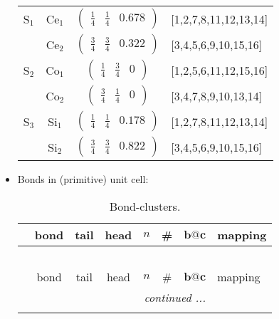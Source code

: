 \documentclass[fleqn,10pt,landscape]{article}
\begin{document}
\begin{itemize}
\begin{center}
\begin{longtable}{cc|c|l}
S$_{1}$ & Ce$_1$ & $\begin{pmatrix} \frac{1}{4} & \frac{1}{4} & 0.678 \end{pmatrix}$ & [1,2,7,8,11,12,13,14] \\
& Ce$_2$ & $\begin{pmatrix} \frac{3}{4} & \frac{3}{4} & 0.322 \end{pmatrix}$ & [3,4,5,6,9,10,15,16] \\ \hline
S$_{2}$ & Co$_1$ & $\begin{pmatrix} \frac{1}{4} & \frac{3}{4} & 0 \end{pmatrix}$ & [1,2,5,6,11,12,15,16] \\
& Co$_2$ & $\begin{pmatrix} \frac{3}{4} & \frac{1}{4} & 0 \end{pmatrix}$ & [3,4,7,8,9,10,13,14] \\ \hline
S$_{3}$ & Si$_1$ & $\begin{pmatrix} \frac{1}{4} & \frac{1}{4} & 0.178 \end{pmatrix}$ & [1,2,7,8,11,12,13,14] \\
& Si$_2$ & $\begin{pmatrix} \frac{3}{4} & \frac{3}{4} & 0.822 \end{pmatrix}$ & [3,4,5,6,9,10,15,16] \\
\end{longtable}
\end{center}

\item Bonds in (primitive) unit cell:
\begin{center}
\renewcommand{\arraystretch}{1.3}
\begin{longtable}{cc|cc|c|c|c|l}
\caption{Bond-clusters.}
 \\
 \hline \hline
 & bond & tail & head & $n$ & \# & $\bm{b}@\bm{c}$ & mapping \\ \hline \endfirsthead

\multicolumn{7}{l}{\tablename\ \thetable{}} \\
 \hline \hline
 & bond & tail & head & $n$ & \# & $\bm{b}@\bm{c}$ & mapping \\ \hline \endhead

 \hline \hline
\multicolumn{7}{r}{\footnotesize\it continued ...} \\ \endfoot


\end{longtable}
\end{center}
\end{itemize}
\end{document}
